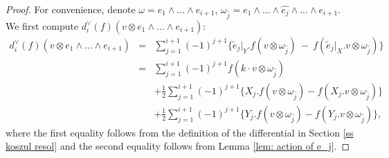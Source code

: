 \documentclass[11pt]{amsart}
\numberwithin{equation}{section}
\theoremstyle{definition}
\renewcommand{\tilde}{\widetilde}
\begin{document}
\begin{proof}
   For convenience, denote $\omega=e_{1}\wedge...\wedge e_{i+1}$, $\omega_{\hat{j}}=e_{1}\wedge...\wedge \hat{e_{j}}\wedge...\wedge e_{i+1}$.
    We first compute $d_{i}^{\vee}(f)(v\otimes e_{1}\wedge...\wedge e_{i+1})$:
    \begin{eqnarray*}
     d_{i}^{\vee}(f)(v\otimes e_{1}\wedge...\wedge e_{i+1})
    &=&\sum_{j=1}^{i+1} (-1)^{j+1} \bigg\{ \widetilde{e}_j|_Y. f(v \otimes \omega_{\hat{j}}) \ - \ f(\tilde{e}_j|_X. v \otimes \omega_{\hat{j}}) \bigg\}\\
    &=& \sum_{j=1}^{i+1} (-1)^{j+1}f(k\cdot v\otimes\omega_{\hat{j}})\\
    &&+\frac{1}{2}\sum_{j=1}^{i+1} (-1)^{j+1}\bigg\{X_{j}.f(v\otimes\omega_{\hat{j}})-f(X_{j}.v\otimes\omega_{\hat{j}})\bigg\}\\
    &&+\frac{1}{2} \sum_{j=1}^{i+1} (-1)^{j+1}\bigg\{Y_{j}.f(v\otimes\omega_{\hat{j}})-f(Y_{j}.v\otimes\omega_{\hat{j}})\bigg\},
\end{eqnarray*}
where the first equality follows from the definition of the differential in Section \ref{ss koszul resol} and the second equality follows from Lemma \ref{lem: action of e_j}.


\end{proof}
\end{document}
